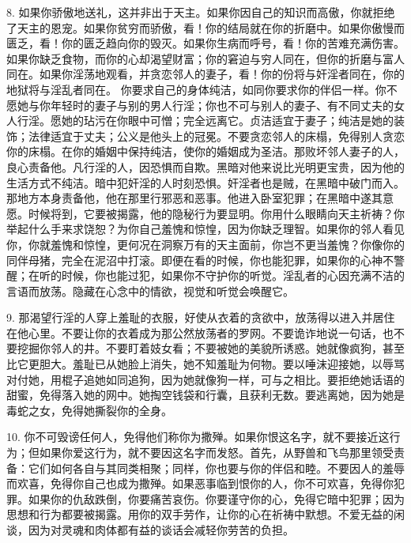 8. 如果你骄傲地送礼，这并非出于天主。如果你因自己的知识而高傲，你就拒绝了天主的恩宠。如果你贫穷而骄傲，看！你的结局就在你的折磨中。如果你傲慢而匮乏，看！你的匮乏趋向你的毁灭。如果你生病而呼号，看！你的苦难充满伤害。如果你缺乏食物，而你的心却渴望财富；你的窘迫与穷人同在，但你的折磨与富人同在。如果你淫荡地观看，并贪恋邻人的妻子，看！你的份将与奸淫者同在，你的地狱将与淫乱者同在。 你要求自己的身体纯洁，如同你要求你的伴侣一样。你不愿她与你年轻时的妻子与别的男人行淫；你也不可与别人的妻子、有不同丈夫的女人行淫。愿她的玷污在你眼中可憎；完全远离它。贞洁适宜于妻子；纯洁是她的装饰；法律适宜于丈夫；公义是他头上的冠冕。不要贪恋邻人的床榻，免得别人贪恋你的床榻。在你的婚姻中保持纯洁，使你的婚姻成为圣洁。那败坏邻人妻子的人，良心责备他。凡行淫的人，因恐惧而自欺。黑暗对他来说比光明更宝贵，因为他的生活方式不纯洁。暗中犯奸淫的人时刻恐惧。奸淫者也是贼，在黑暗中破门而入。那地方本身责备他，他在那里行邪恶和恶事。他进入卧室犯罪；在黑暗中遂其意愿。时候将到，它要被揭露，他的隐秘行为要显明。你用什么眼睛向天主祈祷？你举起什么手来求饶恕？为你自己羞愧和惊惶，因为你缺乏理智。如果你的邻人看见你，你就羞愧和惊惶，更何况在洞察万有的天主面前，你岂不更当羞愧？你像你的同伴母猪，完全在泥沼中打滚。即便在看的时候，你也能犯罪，如果你的心神不警醒；在听的时候，你也能过犯，如果你不守护你的听觉。淫乱者的心因充满不洁的言语而放荡。隐藏在心念中的情欲，视觉和听觉会唤醒它。\par

9. 那渴望行淫的人穿上羞耻的衣服，好使从衣着的贪欲中，放荡得以进入并居住在他心里。不要让你的衣着成为那公然放荡者的罗网。不要诡诈地说一句话，也不要挖掘你邻人的井。不要盯着妓女看；不要被她的美貌所诱惑。她就像疯狗，甚至比它更胆大。羞耻已从她脸上消失，她不知羞耻为何物。要以唾沫迎接她，以辱骂对付她，用棍子追她如同追狗，因为她就像狗一样，可与之相比。要拒绝她话语的甜蜜，免得落入她的网中。她掏空钱袋和行囊，且获利无数。要逃离她，因为她是毒蛇之女，免得她撕裂你的全身。\par

10. 你不可毁谤任何人，免得他们称你为撒殚。如果你恨这名字，就不要接近这行为；但如果你爱这行为，就不要因这名字而发怒。首先，从野兽和飞鸟那里领受责备：它们如何各自与其同类相聚；同样，你也要与你的伴侣和睦。不要因人的羞辱而欢喜，免得你自己也成为撒殚。如果恶事临到恨你的人，你不可欢喜，免得你犯罪。如果你的仇敌跌倒，你要痛苦哀伤。你要谨守你的心，免得它暗中犯罪；因为思想和行为都要被揭露。用你的双手劳作，让你的心在祈祷中默想。不爱无益的闲谈，因为对灵魂和肉体都有益的谈话会减轻你劳苦的负担。\par

